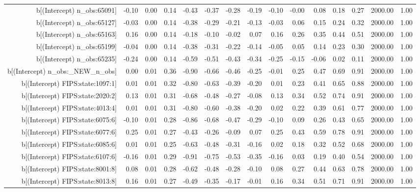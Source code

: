 \begin{table}[ht]
\begin{tabular}{rrrrrrrrrrrrrrr}
  b[(Intercept) n\_obs:65091] & -0.10 & 0.00 & 0.14 & -0.43 & -0.37 & -0.28 & -0.19 & -0.10 & -0.00 & 0.08 & 0.18 & 0.27 & 2000.00 & 1.00 \\ 
  b[(Intercept) n\_obs:65127] & -0.03 & 0.00 & 0.14 & -0.38 & -0.29 & -0.21 & -0.13 & -0.03 & 0.06 & 0.15 & 0.24 & 0.32 & 2000.00 & 1.00 \\ 
  b[(Intercept) n\_obs:65163] & 0.16 & 0.00 & 0.14 & -0.18 & -0.10 & -0.02 & 0.07 & 0.16 & 0.26 & 0.35 & 0.44 & 0.51 & 2000.00 & 1.00 \\ 
  b[(Intercept) n\_obs:65199] & -0.04 & 0.00 & 0.14 & -0.38 & -0.31 & -0.22 & -0.14 & -0.05 & 0.05 & 0.14 & 0.23 & 0.30 & 2000.00 & 1.00 \\ 
  b[(Intercept) n\_obs:65235] & -0.24 & 0.00 & 0.14 & -0.59 & -0.51 & -0.43 & -0.34 & -0.25 & -0.15 & -0.06 & 0.02 & 0.11 & 2000.00 & 1.00 \\ 
  b[(Intercept) n\_obs:\_NEW\_n\_obs] & 0.00 & 0.01 & 0.36 & -0.90 & -0.66 & -0.46 & -0.25 & -0.01 & 0.25 & 0.47 & 0.69 & 0.91 & 2000.00 & 1.00 \\ 
  b[(Intercept) FIPS:state:1097:1] & 0.01 & 0.01 & 0.32 & -0.80 & -0.63 & -0.39 & -0.20 & 0.01 & 0.23 & 0.41 & 0.65 & 0.88 & 2000.00 & 1.00 \\ 
  b[(Intercept) FIPS:state:2020:2] & 0.13 & 0.01 & 0.31 & -0.68 & -0.48 & -0.27 & -0.08 & 0.13 & 0.34 & 0.52 & 0.74 & 0.91 & 2000.00 & 1.00 \\ 
  b[(Intercept) FIPS:state:4013:4] & 0.01 & 0.01 & 0.31 & -0.80 & -0.60 & -0.38 & -0.20 & 0.02 & 0.22 & 0.39 & 0.61 & 0.77 & 2000.00 & 1.00 \\ 
  b[(Intercept) FIPS:state:6075:6] & -0.10 & 0.01 & 0.28 & -0.86 & -0.68 & -0.47 & -0.29 & -0.10 & 0.09 & 0.26 & 0.43 & 0.65 & 2000.00 & 1.00 \\ 
  b[(Intercept) FIPS:state:6077:6] & 0.25 & 0.01 & 0.27 & -0.43 & -0.26 & -0.09 & 0.07 & 0.25 & 0.43 & 0.59 & 0.78 & 0.91 & 2000.00 & 1.00 \\ 
  b[(Intercept) FIPS:state:6085:6] & 0.01 & 0.01 & 0.25 & -0.63 & -0.48 & -0.31 & -0.16 & 0.02 & 0.18 & 0.32 & 0.52 & 0.68 & 2000.00 & 1.00 \\ 
  b[(Intercept) FIPS:state:6107:6] & -0.16 & 0.01 & 0.29 & -0.91 & -0.75 & -0.53 & -0.35 & -0.16 & 0.03 & 0.19 & 0.40 & 0.54 & 2000.00 & 1.00 \\ 
  b[(Intercept) FIPS:state:8001:8] & 0.08 & 0.01 & 0.28 & -0.62 & -0.48 & -0.28 & -0.10 & 0.08 & 0.27 & 0.44 & 0.63 & 0.78 & 2000.00 & 1.00 \\ 
  b[(Intercept) FIPS:state:8013:8] & 0.16 & 0.01 & 0.27 & -0.49 & -0.35 & -0.17 & -0.01 & 0.16 & 0.34 & 0.51 & 0.71 & 0.91 & 2000.00 & 1.00 \\ 

\end{tabular}
\end{table}
